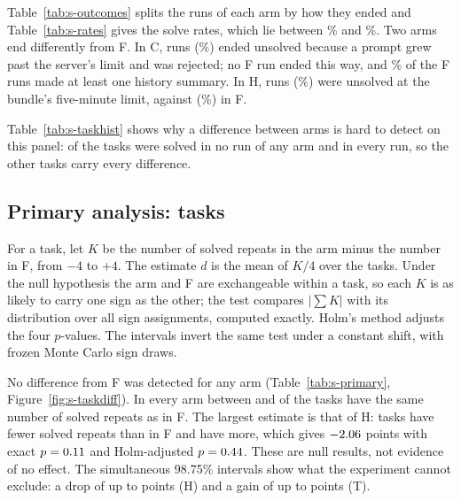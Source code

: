 Table~\ref{tab:s-outcomes} splits the runs of each arm by how they ended and Table~\ref{tab:s-rates} gives the solve
rates, which lie between \SMinRate\% and \SMaxRate\%. Two arms end differently from F. In C, \SCRejected{} runs
(\SCRejectedShare\%) ended unsolved because a prompt grew past the server's limit and was rejected; no F run ended
this way, and \SFCompactedShare\% of the F runs made at least one history summary. In H, \SHUnsolvedAtLimit{} runs
(\SHUnsolvedAtLimitShare\%) were unsolved at the bundle's five-minute limit, against \SFUnsolvedAtLimit{}
(\SFUnsolvedAtLimitShare\%) in F.




Table~\ref{tab:s-taskhist} shows why a difference between arms is hard to detect on this panel: \STasksNever{} of the
\STasks{} tasks were solved in no run of any arm and \STasksAlways{} in every run, so the other \STasksMixed{} tasks
carry every difference.



\subsection{Primary analysis: tasks}

For a task, let $K$ be the number of solved repeats in the arm minus the number in F, from $-4$ to $+4$. The estimate
$d$ is the mean of $K/4$ over the \STasks{} tasks. Under the null hypothesis the arm and F are exchangeable within a
task, so each $K$ is as likely to carry one sign as the other; the test compares $|\sum K|$ with its distribution
over all sign assignments, computed exactly. Holm's method adjusts the four $p$-values. The intervals invert the same
test under a constant shift, with \SReproDraws{} frozen Monte Carlo sign draws.

No difference from F was detected for any arm (Table~\ref{tab:s-primary}, Figure~\ref{fig:s-taskdiff}). In every arm
between \SNoDifferMin{} and \SNoDifferMax{} of the \STasks{} tasks have the same number of solved repeats as in F. The
largest estimate is that of H: \SHTasksDown{} tasks have fewer solved repeats than in F and \SHTasksUp{} have more,
which gives $-2.06$ points with exact $p = 0.11$ and Holm-adjusted $p = 0.44$. These are null results, not
evidence of no effect. The simultaneous 98.75\% intervals show what the experiment cannot exclude: a drop of up to
\SHSimLo{} points (H) and a gain of up to \STSimHi{} points (T).



